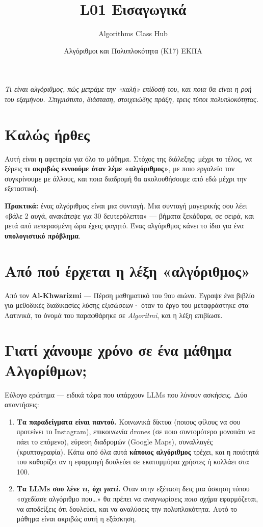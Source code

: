 \documentclass[11pt,a4paper]{article}
\title{\textbf{L01 \textperiodcentered{} Εισαγωγικά}}
\author{Algorithms Class Hub}
\date{\small Αλγόριθμοι και Πολυπλοκότητα (K17) \textperiodcentered{} ΕΚΠΑ}
\begin{document}
\maketitle

\begin{center}\itshape\small
Τι είναι αλγόριθμος, πώς μετράμε την «καλή» επίδοσή του, και ποια θα είναι η ροή
του εξαμήνου. Στιγμιότυπο, διάσταση, στοιχειώδης πράξη, τρεις τύποι πολυπλοκότητας.
\end{center}

\section{Καλώς ήρθες}

Αυτή είναι η αφετηρία για όλο το μάθημα. Στόχος της διάλεξης: μέχρι το τέλος, να
ξέρεις \textbf{τι ακριβώς εννοούμε όταν λέμε «αλγόριθμος»}, με ποιο εργαλείο τον
συγκρίνουμε με άλλους, και ποια διαδρομή θα ακολουθήσουμε από εδώ μέχρι την
εξεταστική.

\begin{intuition}
\textbf{Πρακτικά:} ένας αλγόριθμος είναι μια συνταγή. Μια συνταγή μαγειρικής σου
λέει «βάλε 2 αυγά, ανακάτεψε για 30 δευτερόλεπτα» --- βήματα ξεκάθαρα, σε σειρά,
και μετά από πεπερασμένη ώρα έχεις φαγητό. Ένας αλγόριθμος κάνει το ίδιο για ένα
\textbf{υπολογιστικό πρόβλημα}.
\end{intuition}

\section{Από πού έρχεται η λέξη «αλγόριθμος»}

Από τον \textbf{Al-Khwarizmi} --- Πέρση μαθηματικό του 9ου αιώνα. Έγραψε ένα βιβλίο
για μεθοδικές διαδικασίες λύσης εξισώσεων· όταν το έργο του μεταφράστηκε στα
Λατινικά, το όνομά του παραφθάρηκε σε \textit{Algoritmi}, και η λέξη επιβίωσε.

\section{Γιατί χάνουμε χρόνο σε ένα μάθημα Αλγορίθμων;}

Εύλογο ερώτημα --- ειδικά τώρα που υπάρχουν LLMs που λύνουν ασκήσεις. Δύο
απαντήσεις:

\begin{enumerate}
  \item \textbf{Τα παραδείγματα είναι παντού.} Κοινωνικά δίκτυα (ποιους φίλους να
  σου προτείνει το Instagram), επικοινωνία drones (σε ποιο συντομότερο μονοπάτι να
  πάει το επόμενο), εύρεση διαδρομών (Google Maps), συναλλαγές (κρυπτογραφία).
  Κάτω από όλα αυτά \textbf{κάποιος αλγόριθμος} τρέχει, και η ποιότητά του
  καθορίζει αν η εφαρμογή δουλεύει σε εκατομμύρια χρήστες ή κολλάει στα 100.
  \item \textbf{Τα LLMs σου λένε \textit{τι}, όχι \textit{γιατί}.} Όταν στην
  εξέταση δεις μια άσκηση τύπου «σχεδίασε αλγόριθμο που\dots» θα πρέπει να
  αναγνωρίσεις \textit{ποιο σχήμα} εφαρμόζεται, να αποδείξεις ότι δουλεύει, και να
  αναλύσεις την πολυπλοκότητα. Αυτό το μάθημα είναι ακριβώς αυτή η εξάσκηση.
\end{enumerate}
\end{document}
